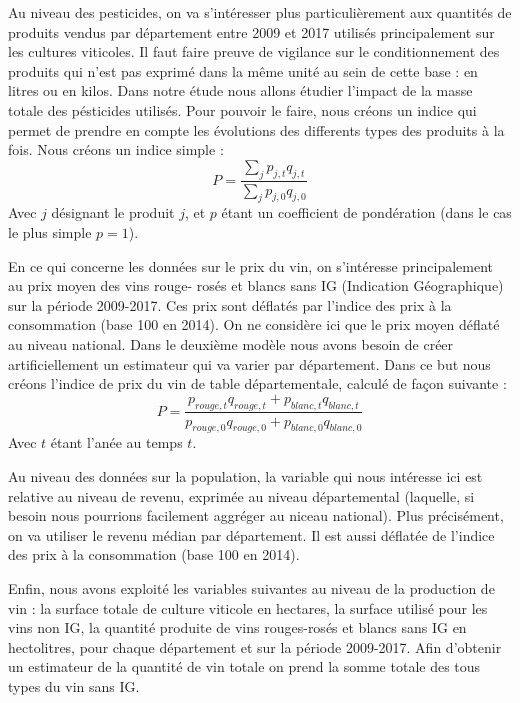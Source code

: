 \documentclass[11pt,]{article}
\begin{document}
Au niveau des pesticides, on va s'intéresser plus particulièrement aux
quantités de produits vendus par département entre 2009 et 2017 utilisés
principalement sur les cultures viticoles. Il faut faire preuve de
vigilance sur le conditionnement des produits qui n'est pas exprimé dans
la même unité au sein de cette base : en litres ou en kilos. Dans notre
étude nous allons étudier l'impact de la masse totale des pésticides
utilisés. Pour pouvoir le faire, nous créons un indice qui permet de
prendre en compte les évolutions des differents types des produits à la
fois. Nous créons un indice simple : \begin{equation*}
  P = \frac{\sum_j p_{j, t} q_{j, t}}{\sum_j p_{j, 0} q_{j, 0}}
\end{equation*} Avec \(j\) désignant le produit \(j\), et \(p\) étant un
coefficient de pondération (dans le cas le plus simple \(p = 1\)).

\par

En ce qui concerne les données sur le prix du vin, on s'intéresse
principalement au prix moyen des vins rouge- rosés et blancs sans IG
(Indication Géographique) sur la période 2009-2017. Ces prix sont
déflatés par l'indice des prix à la consommation (base 100 en 2014). On
ne considère ici que le prix moyen déflaté au niveau national. Dans le
deuxième modèle nous avons besoin de créer artificiellement un
estimateur qui va varier par département. Dans ce but nous créons
l'indice de prix du vin de table départementale, calculé de façon
suivante : \begin{equation*}
  P = \frac{p_{rouge, t} q_{rouge, t} + p_{blanc, t} q_{blanc, t}}{p_{rouge, 0} q_{rouge, 0} + p_{blanc, 0} q_{blanc, 0}}
\end{equation*} Avec \(t\) étant l'anée au temps \(t\).

\par

Au niveau des données sur la population, la variable qui nous intéresse
ici est relative au niveau de revenu, exprimée au niveau départemental
(laquelle, si besoin nous pourrions facilement aggréger au niceau
national). Plus précisément, on va utiliser le revenu médian par
département. Il est aussi déflatée de l'indice des prix à la
consommation (base 100 en 2014).

\par

Enfin, nous avons exploité les variables suivantes au niveau de la
production de vin : la surface totale de culture viticole en hectares,
la surface utilisé pour les vins non IG, la quantité produite de vins
rouges-rosés et blancs sans IG en hectolitres, pour chaque département
et sur la période 2009-2017. Afin d'obtenir un estimateur de la quantité
de vin totale on prend la somme totale des tous types du vin sans IG.
\end{document}
